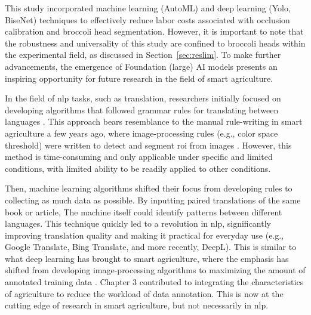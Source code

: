   This study incorporated machine learning (AutoML) and deep learning (Yolo, BiseNet) techniques to effectively reduce labor costs associated with occlusion calibration and broccoli head segmentation. 
  However, it is important to note that the robustness and universality of this study are confined to broccoli heads within the experimental field, as discussed in Section~\ref{sec:reslim}. 
  To make further advancements, the emergence of Foundation (large) AI models presents an inspiring opportunity for future research in the field of smart agriculture.



  In the field of \gls{nlp} tasks, such as translation, 
  researchers initially focused on developing algorithms that followed grammar rules for translating between languages \mbox{\citep{strzalkowski_reversible_1994}}. 
  This approach bears resemblance to the manual rule-writing in smart agriculture a few years ago, where image-processing rules 
  (e.g., color space threshold) were written to detect and segment \gls{roi} from images \mbox{\citep{kapur_new_1985, nobis_automatic_2005, zhou_broccoli_2019, wang_estimating_2019}}. 
  However, this method is time-consuming and only applicable under specific and limited conditions, with limited ability to be readily applied to other conditions.



  Then, machine learning algorithms shifted their focus from developing rules to collecting as much data as possible. 
  By inputting paired translations of the same book or article, 
  The machine itself could identify patterns between different languages. 
  This technique quickly led to a revolution in \gls{nlp}, 
  significantly improving translation quality and making it practical for everyday use 
  (e.g., Google Translate, Bing Translate, and more recently, DeepL). 
  This is similar to what deep learning has brought to smart agriculture, 
  where the emphasis has shifted from developing image-processing algorithms to maximizing the amount of annotated training data \mbox{\citep{zhou_monitoring_2020,blok_image_2021,bauer_combining_2019}}. 
  Chapter 3 contributed to integrating the characteristics of agriculture to reduce the workload of data annotation. 
  This is now at the cutting edge of research in smart agriculture, but not necessarily in \gls{nlp}.




